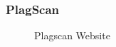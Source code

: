 \newpage
\subsubsection{PlagScan} 

 \begin{figure}[!h]
  \centering
  \caption{Plagscan Website}
  \label{fig:plagawareWebsite}
\end{figure}


